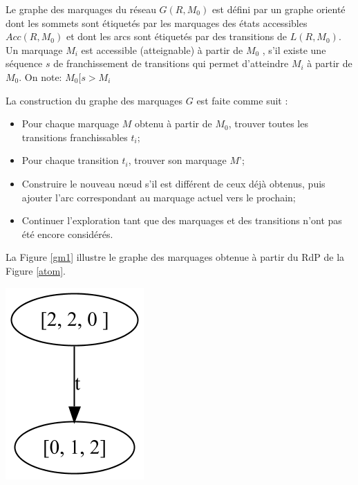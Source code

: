  
\begin{definition}
Le graphe des marquages du réseau $G(R, M_0 )$ est défini par un graphe orienté dont les sommets sont étiquetés par les marquages des états accessibles $Acc(R, M_0 )$ et dont les arcs sont étiquetés par des transitions de $L(R, M_0 )$.
Un marquage $M_i$  est accessible (atteignable) à partir de $M_0$ , s'il existe une séquence $s$ de franchissement de transitions qui permet d'atteindre $M_i$  à partir de $M_0$. On note: $M_0  [s > M_i  $


La construction du graphe des marquages $G$ est faite comme suit \citep{SaidounicoursRdp2017}:
\begin{itemize}
	\item Pour chaque marquage $M$ obtenu à partir de $M_0$, trouver toutes les transitions franchissables $t_i$;
	\item Pour chaque transition $t_i$, trouver son marquage $M’$;
	\item Construire le nouveau nœud s'il est différent de ceux déjà obtenus, puis ajouter l'arc correspondant au marquage actuel vers le prochain;
	\item Continuer l'exploration tant que des marquages et des transitions n'ont pas été encore considérés.
\end{itemize}
La Figure \ref{gm1} illustre le graphe des marquages obtenue à partir du RdP de la Figure \ref{atom}.
\begin{center}
	\includegraphics[scale=0.4]{img/gm1.png}
	 \label{gm1}
 \end{center}
\end{definition}

